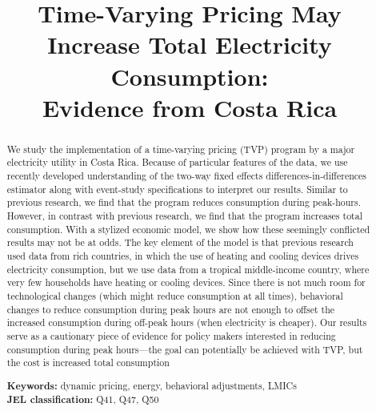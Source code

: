 \title{\vspace{-2cm}
      \normalsize{\textbf{Time-Varying Pricing May Increase Total Electricity Consumption: \\ Evidence from Costa Rica}}
      }

\author{

    \small{ }
}

\date{ }


\maketitle

\thispagestyle{empty}   %

\begin{abstract}
\vspace{-0.25cm}
\noindent
We study the implementation of a time-varying pricing (TVP) program by a major electricity utility in Costa Rica. Because of particular features of the data, we use recently developed understanding of the two-way fixed effects differences-in-differences estimator along with event-study specifications to interpret our results. Similar to previous research, we find that the program reduces consumption during peak-hours. However, in contrast with previous research, we find that the program increases total consumption. With a stylized economic model, we show how these seemingly conflicted results may not be at odds. The key element of the model is that previous research used data from rich countries, in which the use of heating and cooling devices drives electricity consumption, but we use data from a tropical middle-income country, where very few households have heating or cooling devices. Since there is not much room for technological changes (which might reduce consumption at all times), behavioral changes to reduce consumption during peak hours are not enough to offset the increased consumption during off-peak hours (when electricity is cheaper). Our results serve as a cautionary piece of evidence for policy makers interested in reducing consumption during peak hours---the goal can potentially be achieved with TVP, but the cost is increased total consumption

\vspace{0.25cm}

\noindent
\small{
  \hspace{-0.2cm}
  \textbf{Keywords:} dynamic pricing, energy, behavioral adjustments, LMICs
}
\\
\small{
  \textbf{JEL classification:} Q41, Q47, Q50
}
\end{abstract}

\clearpage

